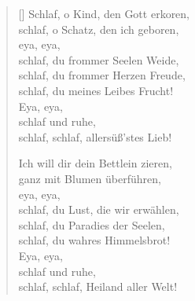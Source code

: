 \begin{multicols}{2}
\begin{verse}[\versewidth]
 Schlaf, o Kind, den Gott erkoren,\\
schlaf, o Schatz, den ich geboren,\\
eya, eya,\\
schlaf, du frommer Seelen Weide,\\
schlaf, du frommer Herzen Freude,\\
schlaf, du meines Leibes Frucht!\\
Eya, eya,\\
schlaf und ruhe,\\
schlaf, schlaf, allersüß'stes Lieb!
 
 Ich will dir dein Bettlein zieren,\\
ganz mit Blumen überführen,\\
eya, eya,\\
schlaf, du Lust, die wir erwählen,\\
schlaf, du Paradies der Seelen,\\
schlaf, du wahres Himmelsbrot!\\
Eya, eya,\\
schlaf und ruhe,\\
schlaf, schlaf, Heiland aller Welt!

\end{verse}
\end{multicols}
